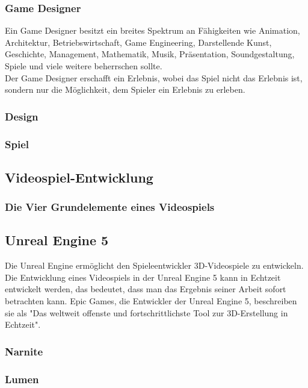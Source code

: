 \documentclass[12pt,a4paper,bibliography=totocnumbered,listof=totocnumbered]{scrartcl}
\begin{document}
\subsubsection{Game Designer}
Ein Game Designer besitzt ein breites Spektrum an Fähigkeiten wie Animation, Architektur, Betriebswirtschaft, Game Engineering, Darstellende Kunst, Geschichte, Management, Mathematik, Musik, Präsentation, Soundgestaltung, Spiele und viele weitere beherrschen sollte.
\\
Der Game Designer erschafft ein Erlebnis, wobei das Spiel nicht das Erlebnis ist, sondern nur die Möglichkeit, dem Spieler ein Erlebnis zu erleben.


\subsubsection{Design}%
\subsubsection{Spiel}%
\subsection{Videospiel-Entwicklung}
\subsubsection{Die Vier Grundelemente eines Videospiels}%
\subsection{Unreal Engine 5}
Die Unreal Engine ermöglicht den Spieleentwickler 3D-Videospiele zu entwickeln. Die Entwicklung eines Videospiels in der Unreal Engine 5 kann in Echtzeit entwickelt werden, das bedeutet, dass man das Ergebnis seiner Arbeit sofort betrachten kann. Epic Games, die Entwickler der Unreal Engine 5, beschreiben sie als "Das weltweit offenste und fortschrittlichste Tool zur 3D-Erstellung in Echtzeit".
\subsubsection{Narnite}
\subsubsection{Lumen}
\end{document}
